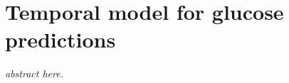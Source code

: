 
\chapter{Temporal model for glucose predictions} \label{chap:diabete}

\begin{displayquote}
	\textit{abstract here.}
\end{displayquote}
